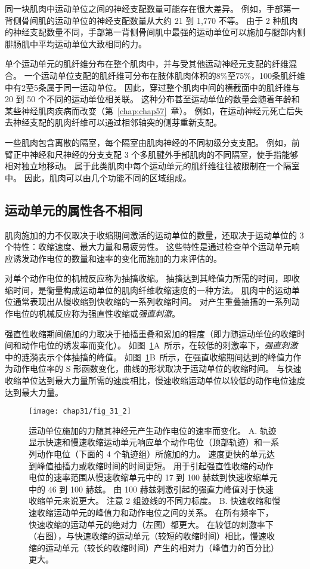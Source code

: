 同一块肌肉中运动单位之间的神经支配数量可能存在很大差异。
例如，手部第一背侧骨间肌的运动单位的神经支配数量从大约 21 到 1,770 不等。
由于 2 种肌肉的神经支配数量不同，手部第一背侧骨间肌中最强的运动单位可以施加与腿部内侧腓肠肌中平均运动单位大致相同的力。


单个运动单元的肌纤维分布在整个肌肉中，并与受其他运动神经元支配的纤维混合。
一个运动单位支配的肌纤维可分布在肢体肌肉体积的8\%至75\%，100条肌纤维中有2至5条属于同一运动单位。
因此，穿过整个肌肉中间的横截面中的肌纤维与 20 到 50 个不同的运动单位相关联。
这种分布甚至运动单位的数量会随着年龄和某些神经肌肉疾病而改变（第~\ref{chap:chap57}~章）。
例如，在运动神经元死亡后失去神经支配的肌肉纤维可以通过相邻轴突的侧芽重新支配。


一些肌肉包含离散的隔室，每个隔室由肌肉神经的不同初级分支支配。
例如，前臂正中神经和尺神经的分支支配 3 个多肌腱外手部肌肉的不同隔室，使手指能够相对独立地移动。
属于此类肌肉中每个运动单元的肌纤维往往被限制在一个隔室中。
因此，肌肉可以由几个功能不同的区域组成。



\subsection{运动单元的属性各不相同}

肌肉施加的力不仅取决于收缩期间激活的运动单位的数量，还取决于运动单位的 3 个特性：收缩速度、最大力量和易疲劳性。
这些特性是通过检查单个运动单元响应诱发动作电位的数量和速率的变化而施加的力来评估的。


对单个动作电位的机械反应称为抽搐收缩。
抽搐达到其峰值力所需的时间，即收缩时间，是衡量构成运动单位的肌肉纤维收缩速度的一种方法。
肌肉中的运动单位通常表现出从慢收缩到快收缩的一系列收缩时间。
对产生重叠抽搐的一系列动作电位的机械反应称为强直性收缩或\textit{强直刺激}。


强直性收缩期间施加的力取决于抽搐重叠和累加的程度（即力随运动单位的收缩时间和动作电位的诱发率而变化）。
如图~\ref{fig:31_2}A~所示，在较低的刺激率下，\textit{强直刺激}中的涟漪表示个体抽搐的峰值。
如图~\ref{fig:31_2}B~所示，在强直收缩期间达到的峰值力作为动作电位率的 S 形函数变化，曲线的形状取决于运动单位的收缩时间。
与快速收缩单位达到最大力量所需的速度相比，慢速收缩运动单位以较低的动作电位速度达到最大力量。


\begin{figure}[htbp]
	\centering
	\texttt{[image: chap31/fig\_31\_2]}
	\caption{运动单位施加的力随其神经元产生动作电位的速率而变化。
		A. 轨迹显示快速和慢速收缩运动单元响应单个动作电位（顶部轨迹）和一系列动作电位（下面的 4 个轨迹组）所施加的力。
	速度更快的单元达到峰值抽搐力或收缩时间的时间更短。
	用于引起强直性收缩的动作电位的速率范围从慢速收缩单元中的 17 到 100 赫兹到快速收缩单元中的 46 到 100 赫兹。
	由 100 赫兹刺激引起的强直力峰值对于快速收缩单元来说更大。
	注意 2 组迹线的不同力标度\cite{botterman1986gradation,fuglevand1999force,macefield1996contractile}。
	B. 快速收缩和慢速收缩运动单元的峰值力和动作电位之间的关系。
	在所有频率下，快速收缩的运动单元的绝对力（左图）都更大。
	在较低的刺激率下（右图），与快速收缩的运动单元（较短的收缩时间）相比，慢速收缩的运动单元（较长的收缩时间）产生的相对力（峰值力的百分比）更大。}
	\label{fig:31_2}
\end{figure}


